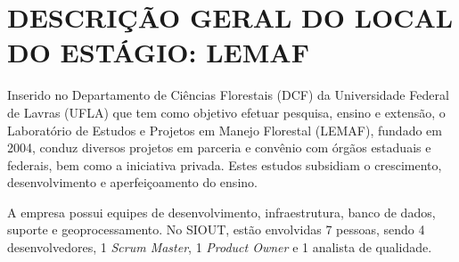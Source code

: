 \chapter{DESCRIÇÃO GERAL DO LOCAL DO ESTÁGIO: LEMAF}

Inserido no Departamento de Ciências Florestais (DCF) da Universidade Federal de Lavras (UFLA) que tem como objetivo efetuar pesquisa, ensino e extensão, o Laboratório de Estudos e Projetos em Manejo Florestal (LEMAF), fundado em 2004, conduz diversos projetos em parceria e convênio com órgãos estaduais e federais, bem como a iniciativa privada. Estes estudos subsidiam o crescimento, desenvolvimento e aperfeiçoamento do ensino. 

A empresa possui equipes de desenvolvimento, infraestrutura, banco de dados, suporte e geoprocessamento. No SIOUT, estão envolvidas 7 pessoas, sendo 4 desenvolvedores, 1 \textit{Scrum Master}, 1 \textit{Product Owner} e 1 analista de qualidade.